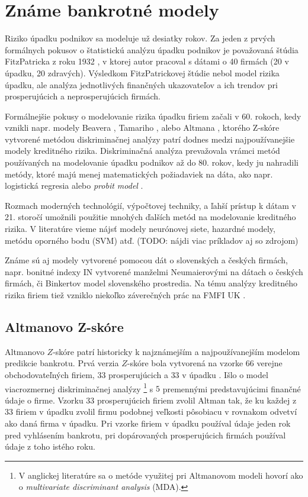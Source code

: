 \section{Známe bankrotné modely}

Riziko úpadku podnikov sa modeluje už desiatky rokov.
Za jeden z prvých formálnych pokusov o štatistickú analýzu úpadku podnikov je považovaná štúdia FitzPatricka z roku 1932 \cite{fitzpatrick},
v ktorej autor pracoval s dátami o 40 firmách (20 v úpadku, 20 zdravých).
Výsledkom FitzPatrickovej štúdie nebol model rizika úpadku, ale analýza jednotlivých finančných ukazovateľov a ich trendov pri prosperujúcich a neprosperujúcich firmách.

Formálnejšie pokusy o modelovanie rizika úpadku firiem začali v 60. rokoch, kedy vznikli napr. modely Beavera \cite{beaver}, Tamariho \cite{tamari}, alebo Altmana \cite{altman1968},
ktorého Z-skóre vytvorené metódou diskriminačnej analýzy patrí dodnes medzi najpoužívanejšie modely kreditného rizika.
Diskriminačná analýza prevažovala vrámci metód používaných na modelovanie úpadku podnikov až do 80. rokov, kedy ju nahradili metódy,
ktoré majú menej matematických požiadaviek na dáta, ako napr. logistická regresia alebo \emph{probit model} \cite{gruszczynski}.

Rozmach moderných technológií, výpočtovej techniky, a ľahší prístup k dátam v 21. storočí umožnili použitie mnohých ďalších metód na modelovanie kreditného rizika.
V literatúre vieme nájsť modely neurónovej siete, hazardné modely, metódu oporného bodu (SVM) atď. (TODO: nájdi viac príkladov aj so zdrojom)

Známe sú aj modely vytvorené pomocou dát o slovenských a českých firmách, napr. bonitné indexy IN vytvorené manželmi Neumaierovými na dátach o českých firmách,
či Binkertov model \cite{zalai} slovenského prostredia.
Na tému analýzy kreditného rizika firiem tiež vzniklo niekoľko záverečných prác na FMFI UK \cite{ondrusekova, bohdal}.

\subsection{Altmanovo Z-skóre}

Altmanovo \(Z\)-skóre patrí historicky k najznámejším a najpoužívanejším modelom predikcie bankrotu.
Prvá verzia \(Z\)-skóre bola vytvorená na vzorke \(66\) verejne obchodovateľných firiem, \(33\) prosperujúcich a \(33\) v úpadku \cite{altman1968}.
Išlo o model viacrozmernej diskriminačnej analýzy
\footnote{V anglickej literatúre sa o metóde využitej pri Altmanovom modeli hovorí ako o \emph{multivariate discriminant analysis} (MDA).}
s \(5\) premennými predstavujúcimi finančné údaje o firme.
Vzorku 33 prosperujúcich firiem zvolil Altman tak, že ku každej z \(33\) firiem v úpadku zvolil firmu podobnej veľkosti pôsobiacu v rovnakom odvetví ako daná firma v úpadku.
Pri vzorke firiem v úpadku používal údaje jeden rok pred vyhlásením bankrotu, pri dopárovaných prosperujúcich firmách používal údaje z toho istého roku.

